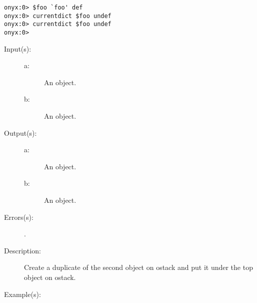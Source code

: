\begin{description}
\begin{description}
\begin{verbatim}
onyx:0> $foo `foo' def
onyx:0> currentdict $foo undef
onyx:0> currentdict $foo undef
onyx:0>
		\end{verbatim}
	\end{description}
\label{systemdict:under}
\item[{\onyxop{a b}{under}{a a b}}: ]
	\begin{description}\item[]
	\item[Input(s): ]
		\begin{description}\item[]
		\item[a: ]
			An object.
		\item[b: ]
			An object.
		\end{description}
	\item[Output(s): ]
		\begin{description}\item[]
		\item[a: ]
			An object.
		\item[b: ]
			An object.
		\end{description}
	\item[Errors(s): ]
		\begin{description}\item[]
		\item[.]
		\end{description}
	\item[Description: ]
		Create a duplicate of the second object on ostack and put it
		under the top object on ostack.
	\item[Example(s): ]\begin{verbatim}


\end{verbatim}
\end{description}
\end{description}
